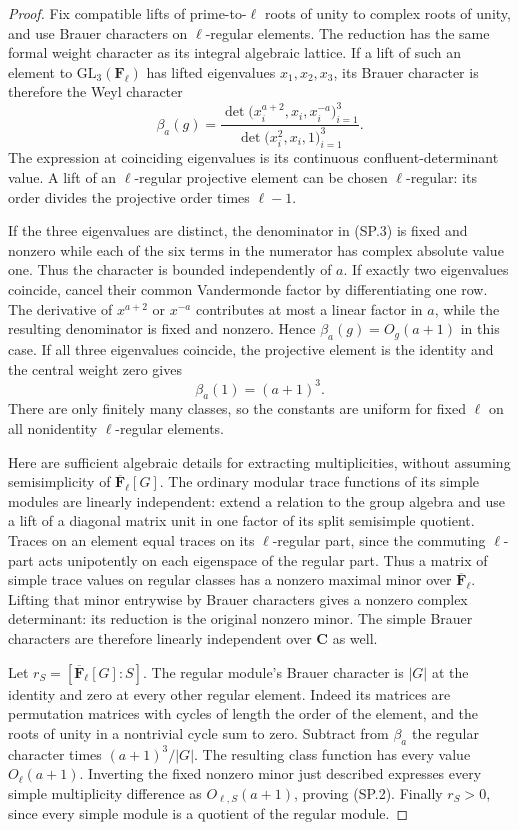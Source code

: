 \documentclass[11pt,a4paper]{article}
\theoremstyle{definition}
\begin{document}
\begin{proof}
Fix compatible lifts of prime-to-$\ell$ roots of unity to complex
roots of unity, and use Brauer characters on $\ell$-regular
elements. The reduction has the same formal weight character
as its integral algebraic lattice. If a lift of such an element
to $\mathrm{GL}_3(\mathbf F_\ell)$ has lifted eigenvalues
$x_1,x_2,x_3$, its Brauer character is therefore the Weyl
character
\[
 \beta_a(g)=
 \frac{\det\bigl(x_i^{a+2},x_i,x_i^{-a}\bigr)_{i=1}^3}
      {\det\bigl(x_i^2,x_i,1\bigr)_{i=1}^3}.
                                                               \tag{SP.3}
\]
The expression at coinciding eigenvalues is its continuous
confluent-determinant value. A lift of an $\ell$-regular
projective element can be chosen $\ell$-regular: its order
divides the projective order times $\ell-1$.

If the three eigenvalues are distinct, the denominator in
(SP.3) is fixed and nonzero while each of the six terms in
the numerator has complex absolute value one. Thus the
character is bounded independently of $a$. If exactly two
eigenvalues coincide, cancel their common Vandermonde factor
by differentiating one row. The derivative of $x^{a+2}$ or
$x^{-a}$ contributes at most a linear factor in $a$, while
the resulting denominator is fixed and nonzero. Hence
$\beta_a(g)=O_g(a+1)$ in this case. If all three eigenvalues
coincide, the projective element is the identity and the
central weight zero gives
\[
                      \beta_a(1)=(a+1)^3.
                                                               \tag{SP.4}
\]
There are only finitely many classes, so the constants are
uniform for fixed $\ell$ on all nonidentity $\ell$-regular
elements.

Here are sufficient algebraic details for extracting
multiplicities, without assuming semisimplicity of
$\overline{\mathbf F}_\ell[G]$. The ordinary modular trace
functions of its simple modules are linearly independent:
extend a relation to the group algebra and use a lift of a
diagonal matrix unit in one factor of its split semisimple
quotient. Traces on an element equal traces on its
$\ell$-regular part, since the commuting $\ell$-part acts
unipotently on each eigenspace of the regular part. Thus a
matrix of simple trace values on regular classes has a
nonzero maximal minor over $\overline{\mathbf F}_\ell$.
Lifting that minor entrywise by Brauer characters gives a
nonzero complex determinant: its reduction is the original
nonzero minor. The simple Brauer characters are therefore
linearly independent over $\mathbf C$ as well.

Let $r_S=[\overline{\mathbf F}_\ell[G]:S]$. The regular
module's Brauer character is $|G|$ at the identity and
zero at every other regular element. Indeed its matrices
are permutation matrices with cycles of length the order
of the element, and the roots of unity in a nontrivial
cycle sum to zero. Subtract from $\beta_a$ the regular
character times $(a+1)^3/|G|$. The resulting class function
has every value $O_\ell(a+1)$. Inverting the fixed nonzero
minor just described expresses every simple multiplicity
difference as $O_{\ell,S}(a+1)$, proving (SP.2).
Finally $r_S>0$, since every simple module is a quotient
of the regular module.
\end{proof}
\end{document}
